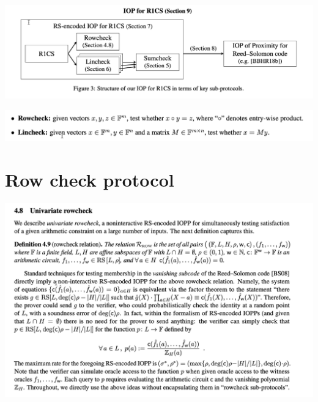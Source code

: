 \documentclass{beamer}
\begin{document}
\begin{frame}{}
	\begin{minipage}{0.42\linewidth}
		\includegraphics[scale=0.30]{t5.png}
	\end{minipage}
\end{frame}



\begin{frame}{}
	\begin{minipage}{0.42\linewidth}
		\includegraphics[scale=0.30]{t3.png}
	\end{minipage}
\end{frame}

\section{Row check protocol}

\begin{frame}{}
	\begin{minipage}{0.42\linewidth}
		\includegraphics[scale=0.30]{t4.png}
	\end{minipage}
\end{frame}
\end{document}
